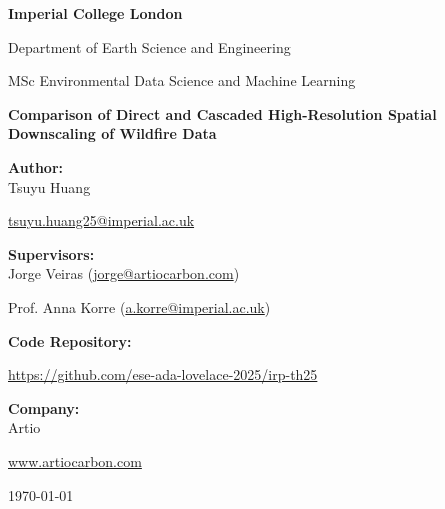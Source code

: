 \documentclass[a4paper, 11pt]{article} %
\begin{document}
\begin{titlepage}
    \centering
    \vspace*{1cm}
    
    {\Large\bfseries Imperial College London \par}
    {\large Department of Earth Science and Engineering \par} %
    {\large MSc Environmental Data Science and Machine Learning \par} %
    
    \vspace{2.5cm}
    
    {\LARGE\bfseries Comparison of Direct and Cascaded High-Resolution Spatial Downscaling of Wildfire Data \par}
    
    \vspace{2.5cm}
    
    {\large\bfseries Author:} \\
    {\large Tsuyu Huang} \\
    {\small \href{mailto:tsuyu.huang25@imperial.ac.uk}{tsuyu.huang25@imperial.ac.uk} \par} %
    
    \vspace{1cm}
    
    {\large\bfseries Supervisors:} \\
    {\large Jorge Veiras (\href{mailto:jorge@artiocarbon.com}{jorge@artiocarbon.com})} \\
    {\large Prof. Anna Korre (\href{mailto:a.korre@imperial.ac.uk}{a.korre@imperial.ac.uk}) \par}

     \vspace{1.5cm}
    
    {\large\bfseries Code Repository:} \\
    {\small \url{https://github.com/ese-ada-lovelace-2025/irp-th25} \par} 

    \vspace{1.5cm}
    
    {\large\bfseries Company:} \\
    {\large Artio} \\
    {\small \href{https://www.artiocarbon.com/}{www.artiocarbon.com} \par}
    
    \vfill
    
    {\large \today \par}
\end{titlepage}
\end{document}
